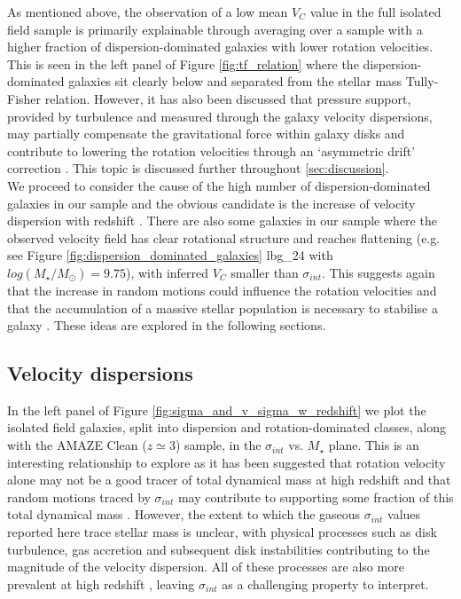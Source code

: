 \documentclass[fleqn,usenatbib]{mnras}
\begin{document}
As mentioned above, the observation of a low mean $V_{C}$ value in the full isolated field sample is primarily explainable through averaging over a sample with a higher fraction of dispersion-dominated galaxies with lower rotation velocities.
This is seen in the left panel of Figure \ref{fig:tf_relation} where the dispersion-dominated galaxies sit clearly below and separated from the stellar mass Tully-Fisher relation.
However, it has also been discussed that pressure support, provided by turbulence and measured through the galaxy velocity dispersions, may partially compensate the gravitational force within galaxy disks and contribute to lowering the rotation velocities through an `asymmetric drift' correction \citep[e.g.][]{Burkert2010,Newman2013,Genzel2017}.
This topic is discussed further throughout \cref{sec:discussion}. \\

\noindent
We proceed to consider the cause of the high number of dispersion-dominated galaxies in our sample and the obvious candidate is the increase of velocity dispersion with redshift \citep[e.g.][]{Genzel2006,Genzel2008,ForsterSchreiber2009,Law2009,Gnerucci2011,Epinat2012,Wisnioski2015}.
There are also some galaxies in our sample where the observed velocity field has clear rotational structure and reaches flattening (e.g. see Figure \ref{fig:dispersion_dominated_galaxies} lbg\_24 with $log(M_{\star}/M_{\odot})=9.75$), with inferred $V_{C}$ smaller than $\sigma_{int}$.
This suggests again that the increase in random motions could influence the rotation velocities and that the accumulation of a massive stellar population is necessary to stabilise a galaxy \citep[e.g.][]{Law2009,Law2012b,Law2012c,Newman2013,Wisnioski2015}.
These ideas are explored in the following sections.

\subsection{Velocity dispersions}\label{subsec:results_velocity_dispersions}

In the left panel of Figure \ref{fig:sigma_and_v_sigma_w_redshift} we plot the isolated field galaxies, split into dispersion and rotation-dominated classes, along with the AMAZE Clean ($z\simeq3$) sample, in the $\sigma_{int}$ vs. $M_{\star}$ plane.
This is an interesting relationship to explore as it has been suggested that rotation velocity alone may not be a good tracer of total dynamical mass at high redshift and that random motions traced by $\sigma_{int}$ may contribute to supporting some fraction of this total dynamical mass \citep[e.g.][]{Kassin2007,Burkert2010,Kassin2012,Law2012b,Law2012c,Ubler2017,Genzel2017}.
However, the extent to which the gaseous $\sigma_{int}$ values reported here trace stellar mass is unclear, with physical processes such as disk turbulence, gas accretion and subsequent disk instabilities contributing to the magnitude of the velocity dispersion.
All of these processes are also more prevalent at high redshift \citep{Genzel2006,ForsterSchreiber2009,Law2009,Genzel2011,Wisnioski2015,Wuyts2016b}, leaving $\sigma_{int}$ as a challenging property to interpret. \\ 
\end{document}
